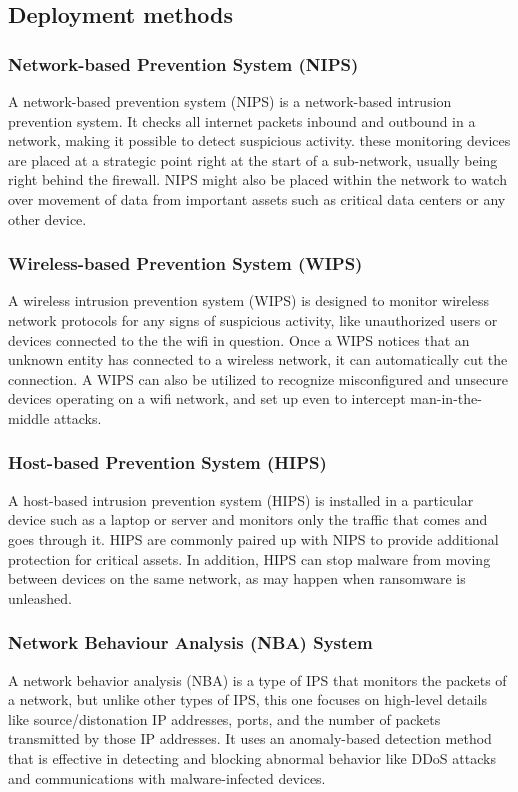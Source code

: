\subsection{Deployment methods}
\subsubsection{Network-based Prevention System (NIPS)}
A network-based prevention system (NIPS) is a network-based intrusion prevention system. It checks all internet packets inbound and outbound in a network, making it possible to detect suspicious activity. these monitoring devices are placed at a strategic point right at the start of a sub-network, usually being right behind the firewall. NIPS might also be placed within the network to watch over movement of data from important assets such as critical data centers or any other device. \cite{IBM-IPS}

\subsubsection{Wireless-based Prevention System (WIPS)}
A wireless intrusion prevention system (WIPS) is designed to monitor wireless network protocols for any signs of suspicious activity, like unauthorized users or devices connected to the the wifi in question. Once a WIPS notices that an unknown entity has connected to a wireless network, it can automatically cut the connection. A WIPS can also be utilized to recognize misconfigured and unsecure devices operating on a wifi network, and set up even to intercept man-in-the-middle attacks.\cite{IBM-IPS}

\subsubsection{Host-based Prevention System (HIPS)}
A host-based intrusion prevention system (HIPS) is installed in a particular device such as a laptop or server and monitors only the traffic that comes and goes through it. HIPS are commonly paired up with NIPS to provide additional protection for critical assets. In addition, HIPS can stop malware from moving between devices on the same network, as may happen when ransomware is unleashed.\cite{IBM-IPS}

\subsubsection{Network Behaviour Analysis (NBA) System}
A network behavior analysis (NBA) is a type of IPS that monitors the packets of a network, but unlike other types of IPS, this one focuses on high-level details like source/distonation IP addresses, ports, and the number of packets transmitted by those IP addresses. It uses an anomaly-based detection method that is effective in detecting and blocking abnormal behavior like DDoS attacks and communications with malware-infected devices.\cite{IBM-IPS}



